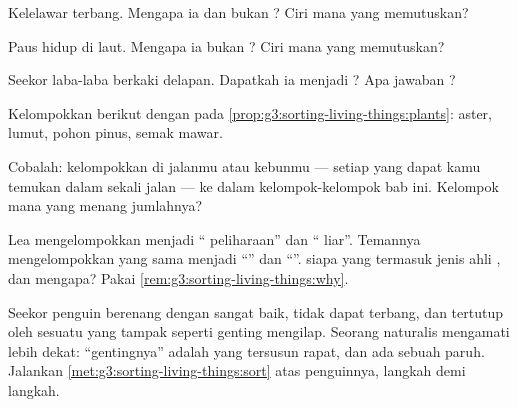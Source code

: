\begin{exercise}[$\star$]\label{exo:g3:sorting-living-things:4}
Kelelawar terbang. Mengapa ia  dan bukan ? Ciri mana yang
memutuskan?
\end{exercise}

\begin{exercise}[$\star$]\label{exo:g3:sorting-living-things:5}
Paus hidup di laut. Mengapa ia bukan ? Ciri mana yang memutuskan?
\end{exercise}

\begin{exercise}[$\star$]\label{exo:g3:sorting-living-things:6}
Seekor laba-laba berkaki delapan. Dapatkah ia menjadi ? Apa
jawaban ?
\end{exercise}

\begin{exercise}[$\star$]\label{exo:g3:sorting-living-things:7}
Kelompokkan  berikut dengan  pada
\cref{prop:g3:sorting-living-things:plants}:  aster, lumut, pohon
pinus, semak mawar.
\end{exercise}

\begin{exercise}[$\star$]\label{exo:g3:sorting-living-things:8}
Cobalah: kelompokkan  di jalanmu atau kebunmu --- setiap 
yang dapat kamu temukan dalam sekali jalan --- ke dalam
kelompok-kelompok bab ini. Kelompok mana yang menang jumlahnya?
\end{exercise}

\begin{exercise}[$\star\star$]\label{exo:g3:sorting-living-things:9}
Lea mengelompokkan  menjadi `` peliharaan'' dan ``
liar''. Temannya mengelompokkan  yang sama menjadi ``''
dan ``''.  siapa yang termasuk jenis ahli ,
dan mengapa? Pakai \cref{rem:g3:sorting-living-things:why}.
\end{exercise}

\begin{exercise}[$\star\star$]\label{exo:g3:sorting-living-things:10}
Seekor penguin berenang dengan sangat baik, tidak dapat terbang, dan
tertutup oleh sesuatu yang tampak seperti genting mengilap. Seorang
naturalis mengamati lebih dekat: ``gentingnya'' adalah 
yang tersusun rapat, dan ada sebuah paruh. Jalankan
\cref{met:g3:sorting-living-things:sort} atas penguinnya, langkah demi
langkah.
\end{exercise}
